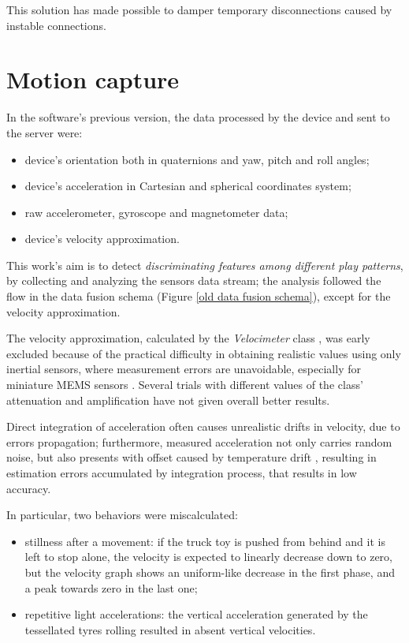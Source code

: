 This solution has made possible to damper temporary disconnections caused by instable connections.

\section{Motion capture}
In the software's previous version, the data processed by the device and sent to the server were:
\begin{itemize}
	\item device's orientation both in quaternions and yaw, pitch and roll angles;
	\item device's acceleration in Cartesian and spherical coordinates system;
	\item raw accelerometer, gyroscope and magnetometer data;
	\item device's velocity approximation.
\end{itemize}

This work's aim is to detect \textit{discriminating features among different play patterns}, by collecting and analyzing the sensors data stream; the analysis followed the flow in the data fusion schema (Figure \ref{old data fusion schema}), except for the velocity approximation.
\bigbreak

The velocity approximation, calculated by the \textit{Velocimeter} class \cite{Pio19}, was early excluded because of the practical difficulty in obtaining realistic values using only inertial sensors, where measurement errors are unavoidable, especially for miniature MEMS sensors \cite{Du15, Est14, Kow15, Liu01, Sei07, UsingAcc, Woo07, Yan06}. Several trials with different values of the class' attenuation and amplification have not given overall better results.

Direct integration of acceleration often causes unrealistic drifts in velocity, due to errors propagation; furthermore, measured acceleration not only carries random noise, but also presents with offset caused by temperature drift \cite{Kow15, Liu01, Woo07}, resulting in estimation errors accumulated by integration process, that results in low accuracy.

In particular, two behaviors were miscalculated:
\begin{itemize}
	\item stillness after a movement: if the truck toy is pushed from behind and it is left to stop alone, the velocity is expected to linearly decrease down to zero, but the velocity graph shows an uniform-like decrease in the first phase, and a peak towards zero in the last one;
	\item repetitive light accelerations: the vertical acceleration generated by the tessellated tyres rolling resulted in absent vertical velocities.
\end{itemize}


